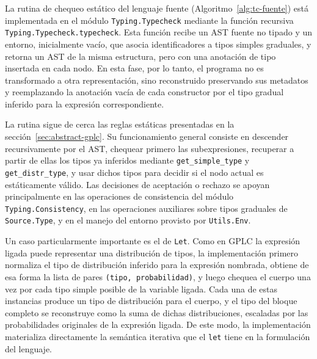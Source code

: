 La rutina de chequeo estático del lenguaje fuente (Algoritmo~\ref{alg:tc-fuente}) está implementada en
el módulo \verb|Typing.Typecheck| mediante la función recursiva
\verb|Typing.Typecheck.typecheck|. Esta función recibe un AST fuente
no tipado y un entorno, inicialmente vacío, que asocia identificadores a tipos
simples graduales, y retorna un AST de la misma estructura, pero con
una anotación de tipo insertada en cada nodo. En esta fase, por lo
tanto, el programa no es transformado a otra representación, sino
reconstruido preservando sus metadatos y reemplazando la anotación
vacía de cada constructor por el tipo gradual inferido para la
expresión correspondiente.

La rutina sigue de cerca las reglas estáticas presentadas en la
sección~\ref{sec:abstract-gplc}. Su funcionamiento general consiste en
descender recursivamente por el AST, chequear primero las
subexpresiones, recuperar a partir de ellas los tipos ya inferidos
mediante \verb|get_simple_type| y \verb|get_distr_type|, y usar
dichos tipos para decidir si el nodo actual es estáticamente válido.
Las decisiones de aceptación o rechazo se apoyan principalmente en las
operaciones de consistencia del módulo \verb|Typing.Consistency|, en las
operaciones auxiliares sobre tipos graduales de \verb|Source.Type|, y
en el manejo del entorno provisto por \verb|Utils.Env|.

Un caso particularmente importante es el de \verb|Let|. Como en GPLC
la expresión ligada puede representar una distribución de tipos, la
implementación primero normaliza el tipo de distribución inferido para
la expresión nombrada, obtiene de esa forma la lista de pares
\verb|(tipo, probabilidad)|, y luego chequea el cuerpo una vez por
cada tipo simple posible de la variable ligada. Cada una de estas
instancias produce un tipo de distribución para el cuerpo, y el tipo
del bloque completo se reconstruye como la suma de dichas
distribuciones, escaladas por las probabilidades originales de la
expresión ligada. De este modo, la implementación materializa
directamente la semántica iterativa que el \verb|let| tiene en la
formulación del lenguaje.


